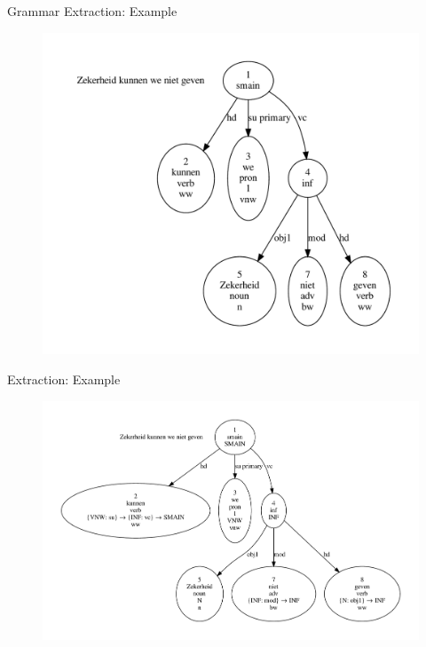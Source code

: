 \documentclass{beamer}
\begin{document}
{
\begin{frame}{Grammar Extraction: Example}
\begin{figure}
\includegraphics[scale=0.5]{zekerheid.pdf}
\end{figure}
\end{frame}
}

{
\begin{frame}{Extraction: Example}
\begin{figure}
\includegraphics[scale=0.38]{zekerheid2.pdf}
\end{figure}
\end{frame}
}
\end{document}
